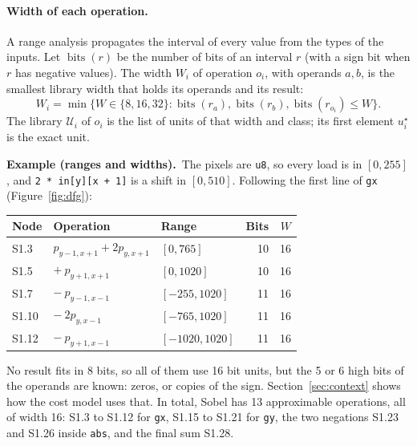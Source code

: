 \documentclass[11pt,a4paper]{article}
\newcommand{\examplebox}[2]{\par\medskip\noindent\colorbox{tabAzul!6}{\begin{minipage}{\dimexpr\linewidth-2\fboxsep}
  \textbf{Example (#1).}\ #2\end{minipage}}\par\medskip}
\begin{document}
\paragraph{Width of each operation.} A range analysis propagates the interval of every value from the types of the
inputs. Let $\operatorname{bits}(r)$ be the number of bits of an interval $r$ (with a sign bit when $r$ has negative
values). The width $W_i$ of operation $o_i$, with operands $a, b$, is the smallest library width that holds its
operands and its result:
\[
  W_i = \min \{ W \in \{8, 16, 32\} : \operatorname{bits}(r_{a}), \operatorname{bits}(r_{b}), \operatorname{bits}(r_{o_i}) \le W \}.
\]
The library $\mathcal{U}_i$ of $o_i$ is the list of units of that width and class; its first element $u_i^{\star}$ is
the exact unit.

\examplebox{ranges and widths}{The pixels are \texttt{u8}, so every load is in $[0, 255]$, and
\texttt{2 * in[y][x + 1]} is a shift in $[0, 510]$. Following the first line of \texttt{gx} (Figure~\ref{fig:dfg}):
\begin{center}
\rowcolors{2}{gray!10}{white}
\begin{tabular}{|l|l|l|r|r|}
\hline
\rowcolor{tabAzul}\color{white} Node & \color{white} Operation & \color{white} Range & \color{white} Bits & \color{white} $W$ \\
\hline
S1.3 & $p_{y-1,x+1} + 2p_{y,x+1}$ & $[0, 765]$ & 10 & 16 \\
S1.5 & $+\ p_{y+1,x+1}$ & $[0, 1020]$ & 10 & 16 \\
S1.7 & $-\ p_{y-1,x-1}$ & $[-255, 1020]$ & 11 & 16 \\
S1.10 & $-\ 2p_{y,x-1}$ & $[-765, 1020]$ & 11 & 16 \\
S1.12 & $-\ p_{y+1,x-1}$ & $[-1020, 1020]$ & 11 & 16 \\
\hline
\end{tabular}
\end{center}
No result fits in 8 bits, so all of them use 16 bit units, but the 5 or 6 high bits of the operands are known: zeros,
or copies of the sign. Section~\ref{sec:context} shows how the cost model uses that. In total, Sobel has 13
approximable operations, all of width 16: S1.3 to S1.12 for \texttt{gx}, S1.15 to S1.21 for \texttt{gy}, the two
negations S1.23 and S1.26 inside \texttt{abs}, and the final sum S1.28.}
\end{document}
